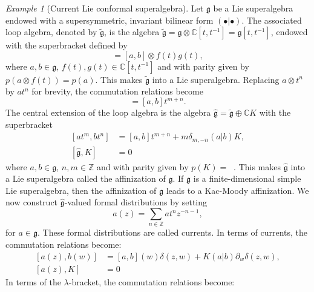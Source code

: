 \documentclass[a4paper, 12pt, reqno]{amsart}
\theoremstyle{remark}
\newtheorem{example}[theorem]{Example}
\numberwithin{equation}{subsection}
\DeclareMathOperator{\zero}{\overline{0}}
\begin{document}
\begin{example}[Current Lie conformal superalgebra]
  Let $\mathfrak{g}$ be a Lie superalgebra endowed with a supersymmetric, invariant bilinear form $(\bullet| \bullet)$.
  The associated loop algebra, denoted by $\tilde{\mathfrak{g}}$, is the algebra $\tilde{\mathfrak{g}} = \mathfrak{g} \otimes \mathbb{C}[t, t^{-1}] = \mathfrak{g}[t, t^{-1}]$, endowed with the superbracket defined by
  \begin{equation*}
    [a\otimes f(t), b\otimes g(t)] = [a, b] \otimes f(t)g(t),
  \end{equation*}
  where $a, b \in \mathfrak{g}$, $f(t), g(t) \in \mathbb{C}[t, t^{-1}]$ and with parity given by $p(a\otimes f(t)) = p(a)$.
  This makes $\tilde{\mathfrak{g}}$ into a Lie superalgebra.
  Replacing $a\otimes t^n$ by $at^n$ for brevity, the commutation relations become
  \begin{equation*}
    [at^m, bt^n]=[a, b]t^{m + n}.
  \end{equation*}
  The central extension of the loop algebra is the algebra $\hat{\mathfrak{g}} = \tilde{\mathfrak{g}} \oplus \mathbb{C}K$ with the superbracket
  \begin{equation*}
    \begin{aligned}
    [at^m, bt^n] &= [a, b]t^{m + n} + m\delta_{m, -n}(a| b)K, \\
    [\hat{\mathfrak{g}}, K] &= 0
    \end{aligned}
  \end{equation*}
  where $a, b \in \mathfrak{g}$, $n, m \in \mathbb{Z}$ and with parity given by $p(K) = \zero$.
  This makes $\hat{\mathfrak{g}}$ into a Lie superalgebra called the affinization of $\mathfrak{g}$.
  If $\mathfrak{g}$ is a finite-dimensional simple Lie superalgebra, then the affinization of $\mathfrak{g}$ leads to a Kac-Moody affinization.
  We now construct $\hat{\mathfrak{g}}$-valued formal distributions by setting
  \begin{equation*}
    a(z) = \sum_{n \in \mathbb{Z}}at^nz^{-n - 1},
  \end{equation*}
  for $a \in \mathfrak{g}$.
  These formal distributions are called currents.
  In terms of currents, the commutation relations become:
  \begin{equation*}
    \begin{aligned}
    [a(z), b(w)] &= [a, b](w)\delta(z, w) + K(a| b)\partial_w\delta(z, w), \\
    [a(z), K] &= 0
    \end{aligned}
  \end{equation*}
  In terms of the $\lambda$-bracket, the commutation relations become:

\end{example}
\end{document}

